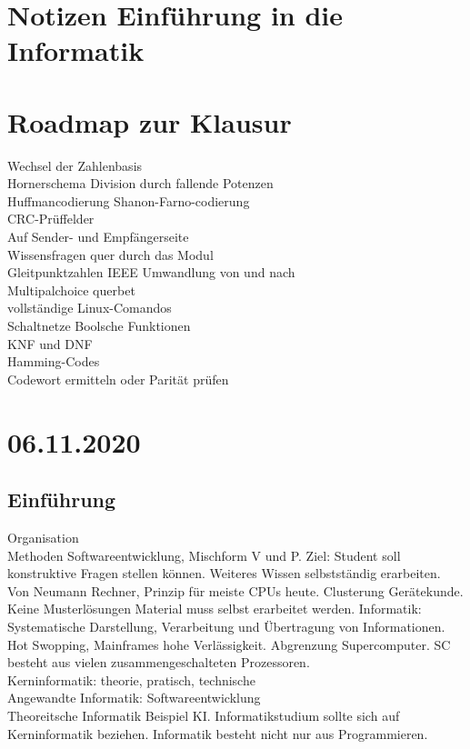 \documentclass{article}
\begin{document}
	\section*{Notizen Einführung in die Informatik}
	\section*{Roadmap zur Klausur}
	Wechsel der Zahlenbasis \\
	Hornerschema Division durch fallende Potenzen  \\
	Huffmancodierung Shanon-Farno-codierung \\
	CRC-Prüffelder \\
	Auf Sender- und Empfängerseite \\
	Wissensfragen quer durch das Modul \\
	Gleitpunktzahlen IEEE Umwandlung von und nach \\
	Multipalchoice querbet \\
	vollständige Linux-Comandos \\
	Schaltnetze Boolsche Funktionen \\
	KNF und DNF \\
	Hamming-Codes \\
	Codewort ermitteln oder Parität prüfen
	
	\section*{06.11.2020}
	\subsection*{Einführung}
	Organisation \\
	Methoden Softwareentwicklung, Mischform V und P. Ziel: Student soll konstruktive Fragen stellen können. Weiteres Wissen selbstständig erarbeiten. \\
	Von Neumann Rechner, Prinzip für meiste CPUs heute. Clusterung Gerätekunde.
	Keine Musterlösungen Material muss selbst erarbeitet werden. 
	Informatik: Systematische Darstellung, Verarbeitung und Übertragung von Informationen.
	Hot Swopping, Mainframes hohe Verlässigkeit. Abgrenzung Supercomputer. SC besteht aus vielen zusammengeschalteten Prozessoren. \\
	Kerninformatik: theorie, pratisch, technische \\
	Angewandte Informatik: Softwareentwicklung \\
	Theoreitsche Informatik Beispiel KI.
	Informatikstudium sollte sich auf Kerninformatik beziehen. Informatik besteht nicht nur aus Programmieren.
\end{document}
